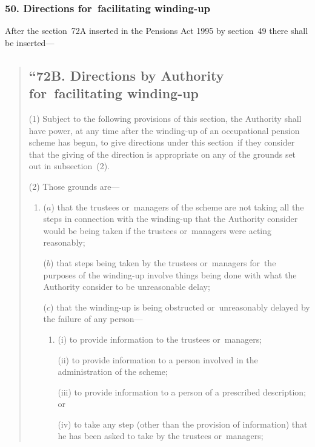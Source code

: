 \documentclass[12pt,a4paper]{article}
\begin{document}

\subsubsection{50. Directions for~facilitating winding-up}

After the section~72A inserted in the Pensions Act 1995 by section~49 there shall be inserted—
\begin{quotation}
\subsection*{\sloppy “72B. Directions by Authority for~facilitating winding\hspace{0pt}-up}

(1) Subject to the following provisions of this section, the Authority shall have power, at any time after the winding-up of an occupational pension scheme has begun, to give directions under this section~if they consider that the giving of the direction is appropriate on any of the grounds set out in subsection~(2).

(2) Those grounds are—
\begin{enumerate}\item[]
($a$) that the trustees or~managers of the scheme are not taking all the steps in connection with the winding-up that the Authority consider would be being taken if the trustees or~managers were acting reasonably;

($b$) that steps being taken by the trustees or~managers for~the purposes of the winding-up involve things being done with what the Authority consider to be unreasonable delay;

($c$) that the winding-up is being obstructed or~unreasonably delayed by the failure of any person—
\begin{enumerate}\item[]
(i) to provide information to the trustees or~managers;

(ii) to provide information to a person involved in the administration of the scheme;

(iii) to provide information to a person of a prescribed description; or

(iv) to take any step (other than the provision of information) that he has been asked to take by the trustees or~managers;
\end{enumerate}


\end{enumerate}
\end{quotation}
\end{document}
